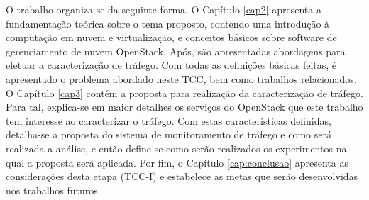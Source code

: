 O trabalho organiza-se da seguinte forma.
%
O Capítulo \ref{cap2} apresenta a fundamentação teórica sobre o tema proposto, contendo uma introdução à computação em nuvem e virtualização, e conceitos básicos sobre software de gerenciamento de nuvem OpenStack.
%
Após, são apresentadas abordagens para efetuar a caracterização de tráfego.
%
Com todas as definições básicas feitas, é apresentado o problema abordado neste TCC, bem como trabalhos relacionados.
%
O Capítulo \ref{cap3} contém a proposta para realização da caracterização de tráfego.
%
Para tal, explica-se em maior detalhes os serviços do OpenStack que este trabalho tem interesse ao caracterizar o tráfego.
%
Com estas características definidas, detalha-se a proposta do sistema de monitoramento de tráfego e como será realizada a análise, e então define-se como serão realizados os experimentos na qual a proposta será aplicada.
%
Por fim, o Capítulo \ref{cap:conclusao} apresenta as considerações desta etapa (TCC-I) e estabelece as metas que serão desenvolvidas nos trabalhos futuros.


